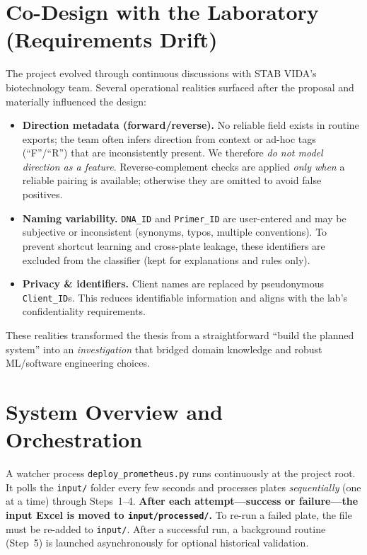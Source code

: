 \section{Co-Design with the Laboratory (Requirements Drift)}
\label{sec:codesign}
The project evolved through continuous discussions with STAB VIDA’s biotechnology team. Several operational realities surfaced after the proposal and materially influenced the design:
\begin{itemize}
  \item \textbf{Direction metadata (forward/reverse).} No reliable field exists in routine exports; the team often infers direction from context or ad-hoc tags (``F''/``R'') that are inconsistently present. We therefore \emph{do not model direction as a feature}. Reverse-complement checks are applied \emph{only when} a reliable pairing is available; otherwise they are omitted to avoid false positives.
  \item \textbf{Naming variability.} \texttt{DNA\_ID} and \texttt{Primer\_ID} are user-entered and may be subjective or inconsistent (synonyms, typos, multiple conventions). To prevent shortcut learning and cross-plate leakage, these identifiers are excluded from the classifier (kept for explanations and rules only).
  \item \textbf{Privacy \& identifiers.} Client names are replaced by pseudonymous \texttt{Client\_ID}s. This reduces identifiable information and aligns with the lab’s confidentiality requirements.
\end{itemize}
These realities transformed the thesis from a straightforward ``build the planned system'' into an \emph{investigation} that bridged domain knowledge and robust ML/software engineering choices.

\section{System Overview and Orchestration}
\label{sec:system_overview}

A watcher process \texttt{deploy\_prometheus.py} runs continuously at the project root. It polls the \texttt{input/} folder every few seconds and processes plates \emph{sequentially} (one at a time) through Steps~1--4. \textbf{After each attempt—success or failure—the input Excel is moved to \texttt{input/processed/}.} To re-run a failed plate, the file must be re-added to \texttt{input/}. After a successful run, a background routine (Step~5) is launched asynchronously for optional historical validation.

